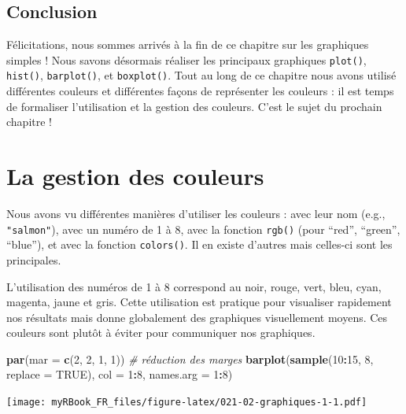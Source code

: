 \documentclass[
]{book}
\newenvironment{Shaded}{\begin{snugshade}}{\end{snugshade}}
\newcommand{\CommentTok}[1]{\textcolor[rgb]{0.56,0.35,0.01}{\textit{#1}}}
\newcommand{\DataTypeTok}[1]{\textcolor[rgb]{0.13,0.29,0.53}{#1}}
\newcommand{\DecValTok}[1]{\textcolor[rgb]{0.00,0.00,0.81}{#1}}
\newcommand{\KeywordTok}[1]{\textcolor[rgb]{0.13,0.29,0.53}{\textbf{#1}}}
\newcommand{\NormalTok}[1]{#1}
\newcommand{\OperatorTok}[1]{\textcolor[rgb]{0.81,0.36,0.00}{\textbf{#1}}}
\newcommand{\OtherTok}[1]{\textcolor[rgb]{0.56,0.35,0.01}{#1}}
\begin{document}
\hypertarget{conclusion-8}{%
\section{Conclusion}\label{conclusion-8}}

Félicitations, nous sommes arrivés à la fin de ce chapitre sur les graphiques simples ! Nous savons désormais réaliser les principaux graphiques \texttt{plot()}, \texttt{hist()}, \texttt{barplot()}, et \texttt{boxplot()}. Tout au long de ce chapitre nous avons utilisé différentes couleurs et différentes façons de représenter les couleurs : il est temps de formaliser l'utilisation et la gestion des couleurs. C'est le sujet du prochain chapitre !

\hypertarget{graph2}{%
\chapter{La gestion des couleurs}\label{graph2}}

Nous avons vu différentes manières d'utiliser les couleurs : avec leur nom (e.g., \texttt{"salmon"}), avec un numéro de 1 à 8, avec la fonction \texttt{rgb()} (pour ``red'', ``green'', ``blue''), et avec la fonction \texttt{colors()}. Il en existe d'autres mais celles-ci sont les principales.

L'utilisation des numéros de 1 à 8 correspond au noir, rouge, vert, bleu, cyan, magenta, jaune et gris. Cette utilisation est pratique pour visualiser rapidement nos résultats mais donne globalement des graphiques visuellement moyens. Ces couleurs sont plutôt à éviter pour communiquer nos graphiques.

\begin{Shaded}
\begin{Highlighting}[]
\KeywordTok{par}\NormalTok{(}\DataTypeTok{mar =} \KeywordTok{c}\NormalTok{(}\DecValTok{2}\NormalTok{, }\DecValTok{2}\NormalTok{, }\DecValTok{1}\NormalTok{, }\DecValTok{1}\NormalTok{)) }\CommentTok{# réduction des marges}
\KeywordTok{barplot}\NormalTok{(}\KeywordTok{sample}\NormalTok{(}\DecValTok{10}\OperatorTok{:}\DecValTok{15}\NormalTok{, }\DecValTok{8}\NormalTok{, }\DataTypeTok{replace =} \OtherTok{TRUE}\NormalTok{), }\DataTypeTok{col =} \DecValTok{1}\OperatorTok{:}\DecValTok{8}\NormalTok{, }\DataTypeTok{names.arg =} \DecValTok{1}\OperatorTok{:}\DecValTok{8}\NormalTok{)}
\end{Highlighting}
\end{Shaded}

\texttt{[image: myRBook\_FR\_files/figure-latex/021-02-graphiques-1-1.pdf]}
\end{document}
